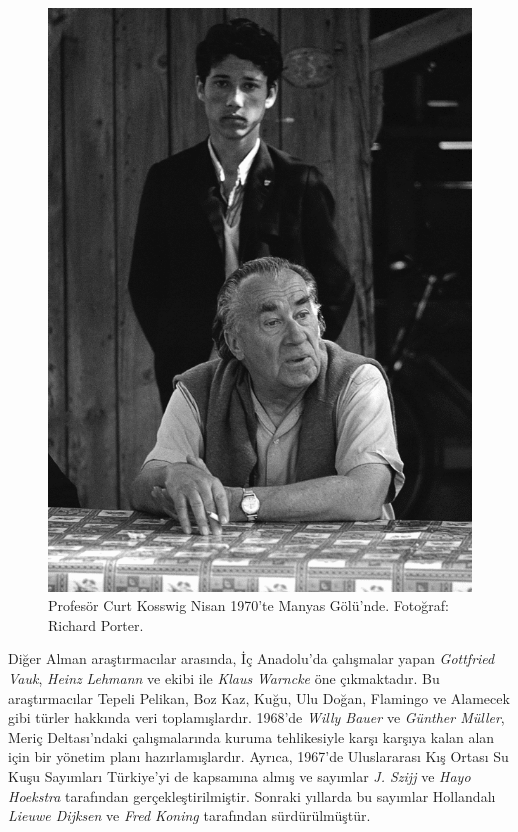 \documentclass[
  a4paper,
  DIV=11,
  numbers=noendperiod]{scrartcl}
\begin{document}
\begin{figure}[H]

{\centering \includegraphics{images/Cosswig.gif}

}

\caption{Profesör Curt Kosswig Nisan 1970'te Manyas Gölü'nde. Fotoğraf:
Richard Porter.}

\end{figure}%

Diğer Alman araştırmacılar arasında, İç Anadolu'da çalışmalar yapan
\emph{Gottfried Vauk}, \emph{Heinz} \emph{Lehmann} ve ekibi ile
\emph{Klaus} \emph{Warncke} öne çıkmaktadır. Bu araştırmacılar Tepeli
Pelikan, Boz Kaz, Kuğu, Ulu Doğan, Flamingo ve Alamecek gibi türler
hakkında veri toplamışlardır. 1968'de \emph{Willy Bauer} ve
\emph{Günther Müller}, Meriç Deltası'ndaki çalışmalarında kuruma
tehlikesiyle karşı karşıya kalan alan için bir yönetim planı
hazırlamışlardır. Ayrıca, 1967'de Uluslararası Kış Ortası Su Kuşu
Sayımları Türkiye'yi de kapsamına almış ve sayımlar \emph{J. Szijj} ve
\emph{Hayo Hoekstra} tarafından gerçekleştirilmiştir. Sonraki yıllarda
bu sayımlar Hollandalı \emph{Lieuwe Dijksen} ve \emph{Fred Koning}
tarafından sürdürülmüştür.
\end{document}
